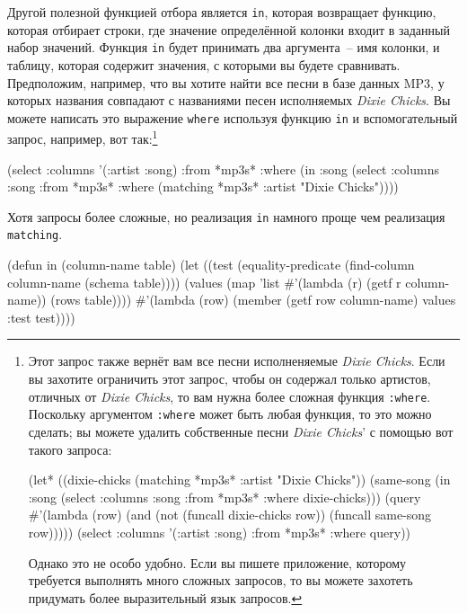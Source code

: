Другой полезной функцией отбора является \lstinline{in}, которая возвращает функцию, которая
отбирает строки, где значение определённой колонки входит в заданный набор значений.
Функция \lstinline{in} будет принимать два аргумента~-- имя колонки, и таблицу, которая
содержит значения, с которыми вы будете сравнивать.  Предположим, например, что вы хотите
найти все песни в базе данных MP3, у которых названия совпадают с названиями песен
исполняемых \textit{Dixie Chicks}.  Вы можете написать это выражение \lstinline{where}
используя функцию \lstinline{in} и вспомогательный запрос, например, вот так:\footnote{Этот
  запрос также вернёт вам все песни исполненяемые \textit{Dixie Chicks}.  Если вы захотите
  ограничить этот запрос, чтобы он содержал только артистов, отличных от \textit{Dixie
    Chicks}, то вам нужна более сложная функция \lstinline{:where}.  Поскольку аргументом
  \lstinline{:where} может быть любая функция, то это можно сделать; вы можете удалить
  собственные песни \textit{Dixie Chicks}' с помощью вот такого запроса:

\begin{myverb}
(let* ((dixie-chicks (matching *mp3s* :artist "Dixie Chicks"))
       (same-song (in :song (select :columns :song :from *mp3s* :where dixie-chicks)))
       (query #'(lambda (row) (and (not (funcall dixie-chicks row)) 
                                   (funcall same-song row)))))
  (select :columns '(:artist :song) :from *mp3s* :where query))
\end{myverb}

Однако это не особо удобно.  Если вы пишете приложение, которому требуется выполнять много
сложных запросов, то вы можете захотеть придумать более выразительный язык запросов.}

\begin{myverb}
(select
  :columns '(:artist :song)
  :from *mp3s*
  :where (in :song 
             (select
               :columns :song
               :from *mp3s*
               :where (matching *mp3s* :artist "Dixie Chicks"))))
\end{myverb}

Хотя запросы более сложные, но реализация \lstinline{in} намного проще чем реализация
\lstinline{matching}.

\begin{myverb}
(defun in (column-name table)
  (let ((test (equality-predicate (find-column column-name (schema table))))
        (values (map 'list #'(lambda (r) (getf r column-name)) (rows table))))
    #'(lambda (row)
        (member (getf row column-name) values :test test))))
\end{myverb}

